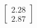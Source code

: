 \documentclass[preview]{standalone}
\begin{document}
\begin{align*}
\begin{bmatrix} 2.28 \\ 2.87 \end{bmatrix}
\end{align*}
\end{document}
